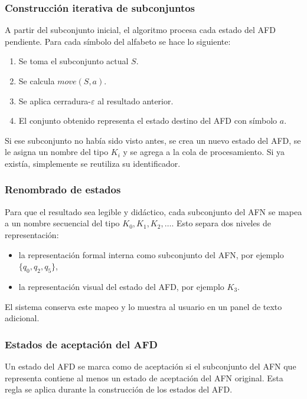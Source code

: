 \documentclass[12pt]{article}
\begin{document}
\subsubsection{Construcción iterativa de subconjuntos}

A partir del subconjunto inicial, el algoritmo procesa cada estado del AFD pendiente. Para cada símbolo del alfabeto se hace lo siguiente:

\begin{enumerate}[label=\alph*)]
    \item Se toma el subconjunto actual $S$.
    \item Se calcula $move(S, a)$.
    \item Se aplica cerradura-$\varepsilon$ al resultado anterior.
    \item El conjunto obtenido representa el estado destino del AFD con símbolo $a$.
\end{enumerate}

Si ese subconjunto no había sido visto antes, se crea un nuevo estado del AFD, se le asigna un nombre del tipo $K_i$ y se agrega a la cola de procesamiento. Si ya existía, simplemente se reutiliza su identificador.

\subsubsection{Renombrado de estados}

Para que el resultado sea legible y didáctico, cada subconjunto del AFN se mapea a un nombre secuencial del tipo $K_0, K_1, K_2, \dots$. Esto separa dos niveles de representación:
\begin{itemize}
    \item la representación formal interna como subconjunto del AFN, por ejemplo $\{q_0, q_2, q_5\}$,
    \item la representación visual del estado del AFD, por ejemplo $K_3$.
\end{itemize}

El sistema conserva este mapeo y lo muestra al usuario en un panel de texto adicional.

\subsubsection{Estados de aceptación del AFD}

Un estado del AFD se marca como de aceptación si el subconjunto del AFN que representa contiene al menos un estado de aceptación del AFN original. Esta regla se aplica durante la construcción de los estados del AFD.
\end{document}
